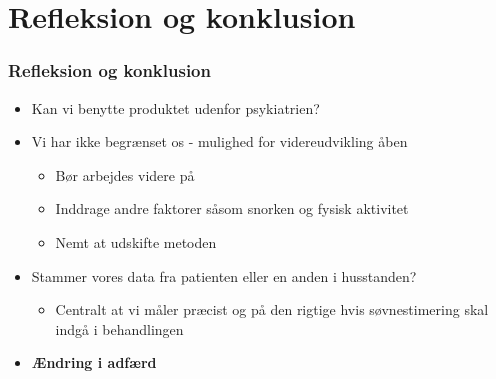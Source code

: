 \section{Refleksion og konklusion}
\begin{frame}
\frametitle{Refleksion og konklusion}
\begin{itemize}
	\item Kan vi benytte produktet udenfor psykiatrien?
	\item Vi har ikke begrænset os - mulighed for videreudvikling åben
	\begin{itemize}
		\item Bør arbejdes videre på
		\item Inddrage andre faktorer såsom snorken og fysisk aktivitet
		\item Nemt at udskifte metoden
	\end{itemize}
	\item Stammer vores data fra patienten eller en anden i husstanden?
	\begin{itemize}
		\item Centralt at vi måler præcist og på den rigtige hvis søvnestimering skal indgå i behandlingen
	\end{itemize}
	\item \textbf{Ændring i adfærd}
\end{itemize}
\end{frame}

